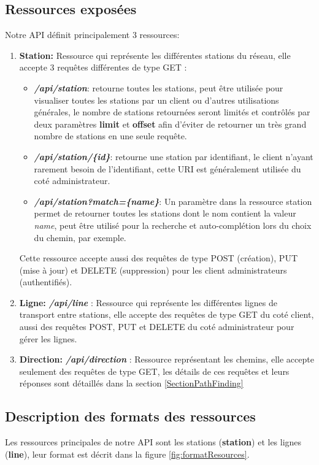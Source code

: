 \subsection{Ressources exposées}
Notre API définit principalement 3 ressources:
\begin{enumerate}
	\item \textbf{Station:} Ressource qui représente les différentes stations du réseau, elle accepte 3 requêtes différentes de type GET  : 
	      \begin{itemize}
	      	\item \emph{\textbf{/api/station}}: retourne toutes les stations, peut être utilisée pour visualiser toutes les stations par un client ou d'autres utilisations générales, le nombre de stations retournées seront limités et contrôlés par deux paramètres \textbf{limit} et \textbf{offset} afin d'éviter de retourner un très grand nombre de stations en une seule requête.
	      	\item \emph{\textbf{/api/station/\{id\}}}: retourne une station par identifiant, le client n'ayant rarement besoin de l'identifiant, cette URI est généralement utilisée du coté administrateur.
	      	\item \emph{\textbf{/api/station?match=\{name\}}}: Un paramètre dans la ressource station permet de retourner toutes les stations dont le nom contient la valeur \emph{name}, peut être utilisé pour la recherche et auto-complétion lors du choix du chemin, par exemple.
	      \end{itemize}
	      	      			
	      Cette ressource accepte aussi des requêtes de type POST (création), PUT (mise à jour) et DELETE (suppression)  pour les client administrateurs (authentifiés).
	\item \textbf{Ligne:} \emph{\textbf{/api/line}} : Ressource qui représente les différentes lignes de transport entre stations, elle accepte des requêtes de type GET du coté client, aussi des requêtes POST, PUT et DELETE du coté administrateur pour gérer les lignes.
	\item \textbf{Direction:}  \emph{\textbf{/api/direction}} : Ressource représentant les chemins, elle accepte seulement des requêtes de type GET, les détails de ces requêtes et leurs réponses sont détaillés dans la section \ref{SectionPathFinding}
\end{enumerate}
\subsection{Description des formats des ressources}
Les ressources principales de notre API sont les stations (\textbf{station}) et les lignes (\textbf{line}), leur format est décrit dans la figure \ref{fig:formatResources}.
\label{ref:resources}

